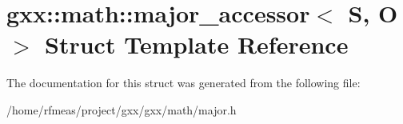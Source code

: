 \hypertarget{structgxx_1_1math_1_1major__accessor}{}\section{gxx\+:\+:math\+:\+:major\+\_\+accessor$<$ S, O $>$ Struct Template Reference}
\label{structgxx_1_1math_1_1major__accessor}


The documentation for this struct was generated from the following file\+:\begin{DoxyCompactItemize}
\item 
/home/rfmeas/project/gxx/gxx/math/major.\+h\end{DoxyCompactItemize}
